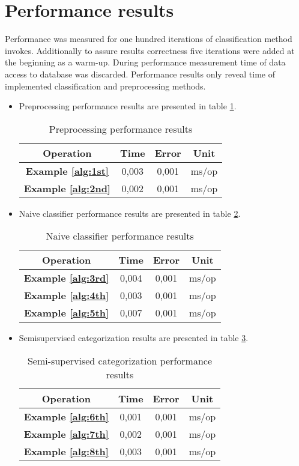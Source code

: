 \section{Performance results}
Performance was measured for one hundred iterations of classification method invokes. Additionally to assure results correctness five iterations were added at the beginning as a warm-up. During performance measurement time of data access to database was discarded. Performance results only reveal time of implemented classification and preprocessing methods.
\begin{itemize}
	\item Preprocessing performance results are presented in table \ref{tabPreprocessing}. 
	\begin{table}[H]
	\centering
	\begin{tabular}{ | c | c | c | c |}
		\hline
		Operation & Time & Error & Unit\\ \hline		
		\textbf{Example \ref{alg:1st}} & 0,003 & 0,001 & ms/op \\
		\textbf{Example \ref{alg:2nd}} & 0,002 & 0,001 & ms/op \\		
		\hline
	\end{tabular}
	\caption{Preprocessing performance results}
	\label{tabPreprocessing}
	\end{table}
	\item Naive classifier performance results are presented in table \ref{tabNaive}.
	\begin{table}[H]
	\centering
	\begin{tabular}{ | c | c | c | c |}
		\hline
		Operation & Time & Error & Unit\\ \hline		
		\textbf{Example \ref{alg:3rd}} & 0,004 &  0,001 & ms/op \\
		\textbf{Example \ref{alg:4th}} & 0,003 &  0,001 & ms/op \\
		\textbf{Example \ref{alg:5th}} & 0,007 &  0,001 & ms/op \\
		\hline
	\end{tabular}
	\caption{Naive classifier performance results}
	\label{tabNaive}
\end{table}
	\item Semisupervised categorization results are presented in table \ref{tabSemi}.
		\begin{table}[H]
			\centering
			\begin{tabular}{ | c | c | c | c |}
				\hline
				Operation & Time & Error & Unit\\ \hline		
				\textbf{Example \ref{alg:6th}} & 0,001 &  0,001 & ms/op \\
				\textbf{Example \ref{alg:7th}} & 0,002 &  0,001 & ms/op \\
				\textbf{Example \ref{alg:8th}} & 0,003 &  0,001 & ms/op \\
					\hline
				\end{tabular}
				\caption{Semi-supervised categorization performance results}
				\label{tabSemi}
			\end{table}
\end{itemize}
